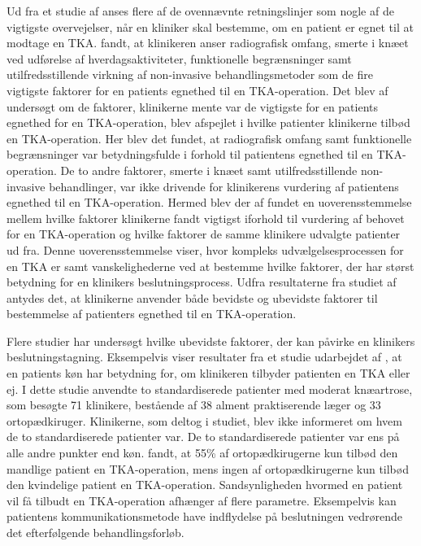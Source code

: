 Ud fra et studie af  anses flere af de ovennævnte retningslinjer som nogle af de vigtigste overvejelser, når en kliniker skal bestemme, om en patient er egnet til at modtage en TKA.  fandt, at klinikeren anser radiografisk omfang, smerte i knæet ved udførelse af hverdagsaktiviteter, funktionelle begrænsninger samt utilfredsstillende virkning af non-invasive behandlingsmetoder som de fire vigtigste faktorer for en patients egnethed til en TKA-operation. Det blev af  undersøgt om de faktorer, klinikerne mente var de vigtigste for en patients egnethed for en TKA-operation, blev afspejlet i hvilke patienter klinikerne tilbød en TKA-operation. Her blev det fundet, at radiografisk omfang samt funktionelle begrænsninger var betydningsfulde i forhold til patientens egnethed til en TKA-operation. De to andre faktorer, smerte i knæet samt utilfredsstillende non-invasive behandlinger, var ikke drivende for klinikerens vurdering af patientens egnethed til en TKA-operation. Hermed blev der af  fundet en uoverensstemmelse mellem hvilke faktorer klinikerne fandt vigtigst iforhold til vurdering af behovet for en TKA-operation og hvilke faktorer de samme klinikere udvalgte patienter ud fra. Denne uoverensstemmelse viser, hvor kompleks udvælgelsesprocessen for en TKA er samt vanskelighederne ved at bestemme hvilke faktorer, der har størst betydning for en klinikers beslutningsprocess. Udfra resultaterne fra studiet af  antydes det, at klinikerne anvender både bevidste og ubevidste faktorer til bestemmelse af patienters egnethed til en TKA-operation.    


Flere studier har undersøgt hvilke ubevidste faktorer, der kan påvirke en klinikers beslutningstagning. Eksempelvis viser resultater fra et studie udarbejdet af , at en patients køn har betydning for, om klinikeren tilbyder patienten en TKA eller ej. I dette studie anvendte  to standardiserede patienter med moderat knæartrose, som besøgte 71 klinikere, bestående af 38 alment praktiserende læger og 33 ortopædkiruger. Klinikerne, som deltog i studiet, blev ikke informeret om hvem de to standardiserede patienter var. De to standardiserede patienter var ens på alle andre punkter end køn.  fandt, at 55\% af ortopædkirugerne  kun tilbød den mandlige patient en TKA-operation, mens ingen af ortopædkirugerne  kun tilbød den kvindelige patient en TKA-operation. Sandsynligheden hvormed en patient vil få tilbudt en TKA-operation afhænger af flere parametre. Eksempelvis kan patientens kommunikationsmetode have indflydelse på beslutningen vedrørende det efterfølgende behandlingsforløb. \citep{borkhoff2008}

